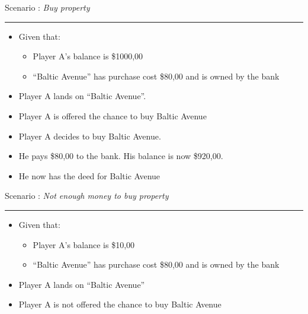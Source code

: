 \documentclass[handout,t,12pt]{beamer}
\newcommand{\Square}[1]{``#1''}
\newcommand{\money}[1]{\$#1,00}
\newcounter{scenarioid}\setcounter{scenarioid}{0}
\newenvironment{scenario}[1]{%
\addtocounter{scenarioid}{1} 
{\Large Scenario \thescenarioid: \emph{#1}\\[3px]\hrule}
\vspace{1\bigskipamount}
}{%
}
\begin{document}
  \begin{frame}
    \begin{scenario}{Buy property}
      \begin{itemize}
        \item Given that:
        \begin{itemize}
          \item Player A's balance is \money{1000}
          \item \Square{Baltic Avenue} has purchase cost \money{80} and is owned by the bank
        \end{itemize}
        \item Player A lands on \Square{Baltic Avenue}.
        \item Player A is offered the chance to buy Baltic Avenue
        \item Player A decides to buy Baltic Avenue.
        \item He pays \money{80} to the bank.  His balance is now \money{920}.
        \item He now has the deed for Baltic Avenue
      \end{itemize}
    \end{scenario}
  \end{frame}
  


  \begin{frame}
    \begin{scenario}{Not enough money to buy property}
      \begin{itemize}
        \item Given that:
        \begin{itemize}
          \item Player A's balance is \money{10}
          \item \Square{Baltic Avenue} has purchase cost \money{80} and is owned by the bank
        \end{itemize}
        \item Player A lands on \Square{Baltic Avenue}
        \item Player A is not offered the chance to buy Baltic Avenue
      \end{itemize}
    \end{scenario}
  \end{frame}
  
\end{document}

